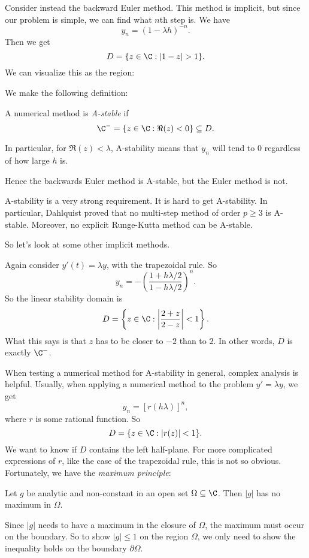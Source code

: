 \documentclass[a4paper]{article}
\begin{document}
\begin{eg}
  Consider instead the backward Euler method. This method is implicit, but since our problem is simple, we can find what $n$th step is. We have
  \[
    y_n = (1 - \lambda h)^{-n}.
  \]
  Then we get
  \[
    D = \{z \in \C: |1 - z| > 1\}.
  \]
  We can visualize this as the region:
  \begin{center}
  \end{center}
\end{eg}
We make the following definition:
\begin{defi}[A-stability]
  A numerical method is \emph{A-stable} if
  \[
    \C^- = \{z \in \C: \Re(z) < 0\} \subseteq D.
  \]
\end{defi}
In particular, for $\Re(z) < \lambda$, A-stability means that $y_n$ will tend to $0$ regardless of how large $h$ is.

Hence the backwards Euler method is A-stable, but the Euler method is not.

A-stability is a very strong requirement. It is hard to get A-stability. In particular, Dahlquist proved that no multi-step method of order $p \geq 3$ is A-stable. Moreover, no explicit Runge-Kutta method can be A-stable.

So let's look at some other implicit methods.
\begin{eg}
  Again consider $y'(t) = \lambda y$, with the trapezoidal rule. So
  \[
    y_n = -\left(\frac{1 + h\lambda/2}{1 - h\lambda/2}\right)^n.
  \]
  So the linear stability domain is
  \[
    D = \left\{z \in \C: \left|\frac{2 + z}{2 - z}\right| < 1 \right\}.
  \]
  What this says is that $z$ has to be closer to $-2$ than to $2$. In other words, $D$ is exactly $\C^-$.
\end{eg}

When testing a numerical method for A-stability in general, complex analysis is helpful. Usually, when applying a numerical method to the problem $y' = \lambda y$, we get
\[
  y_n = [r(h\lambda)]^n,
\]
where $r$ is some rational function. So
\[
  D = \{z \in \C: |r(z)| < 1\}.
\]
We want to know if $D$ contains the left half-plane. For more complicated expressions of $r$, like the case of the trapezoidal rule, this is not so obvious. Fortunately, we have the \emph{maximum principle}:
\begin{thm}
  Let $g$ be analytic and non-constant in an open set $\Omega \subseteq \C$. Then $|g|$ has no maximum in $\Omega$.
\end{thm}
Since $|g|$ needs to have a maximum in the closure of $\Omega$, the maximum must occur on the boundary. So to show $|g| \leq 1$ on the region $\Omega$, we only need to show the inequality holds on the boundary $\partial \Omega$.
\end{document}

